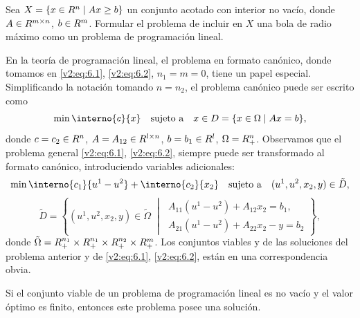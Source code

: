 \begin{exercise}\label{v2:ejer:6.1.1}
    Sea $X = \{ x \in R^n \mid Ax \ge b \}$ un conjunto acotado con interior no vacío, donde $A \in R^{m \times n}$, $b \in R^m$. 
    Formular el problema de incluir en $X$ una bola de radio máximo como un problema de programación lineal.
\end{exercise}

En la teoría de programación lineal, el problema en formato canónico, donde tomamos en \eqref{v2:eq:6.1}, \eqref{v2:eq:6.2}, $n_1 = m = 0$, tiene un papel especial. Simplificando la notación tomando $n = n_2$, el problema canónico puede ser escrito como
\begin{equation}
    \min \interno{c}{x} \quad \text{sujeto a} \quad x \in D = \{ x \in \Omega \mid Ax = b \},
    \label{v2:eq:6.3}
\end{equation}
donde $c = c_2 \in R^n$, $A = A_{12} \in R^{l \times n}$, $b = b_1 \in R^l$, $\Omega = R^n_+$. Observamos que el problema general \eqref{v2:eq:6.1}, \eqref{v2:eq:6.2}, siempre puede ser transformado al formato canónico, introduciendo variables adicionales:
\[
    \min \interno{c_1}{u^1 - u^2} + \interno{c_2}{x_2} \quad \text{sujeto a} \quad (u^1, u^2, x_2, y) \in \tilde{D},
\]
\[
    \tilde{D} = \left\{ (u^1, u^2, x_2, y) \in \tilde{\Omega} \;\middle|\; \begin{array}{l} A_{11}(u^1 - u^2) + A_{12}x_2 = b_1, \\ A_{21}(u^1 - u^2) + A_{22}x_2 - y = b_2 \end{array} \right\},
\]
donde $\tilde{\Omega} = R^{n_1}_+ \times R^{n_1}_+ \times R^{n_2}_+ \times R^m_+$. Los conjuntos viables y de las soluciones del problema anterior y de \eqref{v2:eq:6.1}, \eqref{v2:eq:6.2}, están en una correspondencia obvia.

\begin{theorem}\label{v2:thm:6.1.1}
    Si el conjunto viable de un problema de programación lineal es no vacío y el valor óptimo es finito, entonces este problema posee una solución.
\end{theorem}

